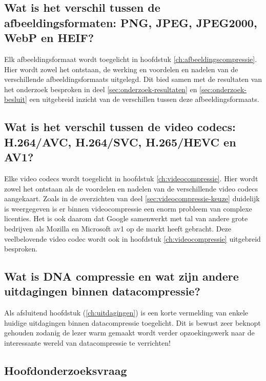 \subsection*{Wat is het verschil tussen de afbeeldingsformaten: PNG, JPEG, JPEG2000, WebP en HEIF?}
\label{sec:onderzoeksvraag-5}

Elk \gls{afbeeldingsformaat} wordt toegelicht in hoofdstuk \ref{ch:afbeeldingscompressie}. Hier wordt zowel het ontstaan, de werking en voordelen en nadelen van de verschillende \glspl{afbeeldingsformaat} uitgelegd. Dit bied samen met de resultaten van het onderzoek besproken in deel \ref{sec:onderzoek-resultaten} en \ref{sec:onderzoek-besluit} een uitgebreid inzicht van de verschillen tussen deze \glspl{afbeeldingsformaat}.

\subsection*{Wat is het verschil tussen de video codecs: H.264/AVC, H.264/SVC, H.265/HEVC en AV1?}
\label{sec:conclussie-onderzoeksvraag-6}

Elke video \glspl{codec} wordt toegelicht in hoofdstuk \ref{ch:videocompressie}. Hier wordt zowel het ontstaan als de voordelen en nadelen van de verschillende video \glspl{codec} aangekaart. Zoals in de overzichten van deel \ref{sec:videocompressie-keuze} duidelijk is weergegeven is er binnen \gls{videocompressie} een enorm probleem van complexe licenties. Het is ook daarom dat Google samenwerkt met tal van andere grote bedrijven als Mozilla en Microsoft \gls{av1} op de markt heeft gebracht. Deze veelbelovende video \gls{codec} wordt ook in hoofdstuk \ref{ch:videocompressie} uitgebreid besproken.

\subsection*{Wat is DNA compressie en wat zijn andere uitdagingen binnen datacompressie?}
\label{sec:onderzoeksvraag-7}

Als afsluitend hoofdstuk (\ref{ch:uitdagingen}) is een korte vermelding van enkele huidige uitdagingen binnen \gls{datacompressie} toegelicht. Dit is bewust zeer beknopt gehouden zodanig de lezer warm gemaakt wordt verder opzoekingswerk naar de interessante wereld van \gls{datacompressie} te verrichten!

\subsection{Hoofdonderzoeksvraag}
\label{sec:conclussie-hoofdonderzoeksvraag}

